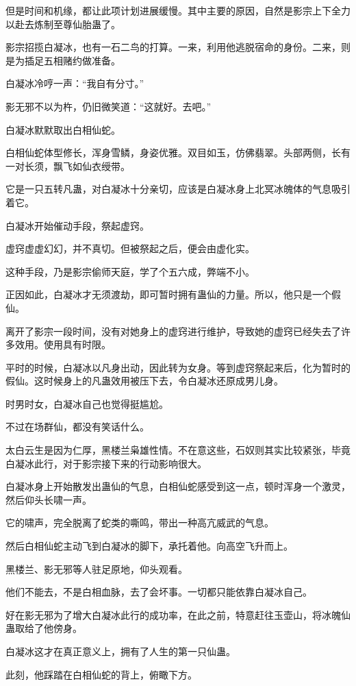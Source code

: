 \begin{this_body}
但是时间和机缘，都让此项计划进展缓慢。其中主要的原因，自然是影宗上下全力以赴去炼制至尊仙胎蛊了。

影宗招揽白凝冰，也有一石二鸟的打算。一来，利用他逃脱宿命的身份。二来，则是为插足五相赌约做准备。

白凝冰冷哼一声：“我自有分寸。”

影无邪不以为杵，仍旧微笑道：“这就好。去吧。”

白凝冰默默取出白相仙蛇。

白相仙蛇体型修长，浑身雪鳞，身姿优雅。双目如玉，仿佛翡翠。头部两侧，长有一对长须，飘飞如仙衣绶带。

它是一只五转凡蛊，对白凝冰十分亲切，应该是白凝冰身上北冥冰魄体的气息吸引着它。

白凝冰开始催动手段，祭起虚窍。

虚窍虚虚幻幻，并不真切。但被祭起之后，便会由虚化实。

这种手段，乃是影宗偷师天庭，学了个五六成，弊端不小。

正因如此，白凝冰才无须渡劫，即可暂时拥有蛊仙的力量。所以，他只是一个假仙。

离开了影宗一段时间，没有对她身上的虚窍进行维护，导致她的虚窍已经失去了许多效用。使用具有时限。

平时的时候，白凝冰以凡身出动，因此转为女身。等到虚窍祭起来后，化为暂时的假仙。这时候身上的凡蛊效用被压下去，令白凝冰还原成男儿身。

时男时女，白凝冰自己也觉得挺尴尬。

不过在场群仙，都没有笑话什么。

太白云生是因为仁厚，黑楼兰枭雄性情。不在意这些，石奴则其实比较紧张，毕竟白凝冰此行，对于影宗接下来的行动影响很大。

白凝冰身上开始散发出蛊仙的气息，白相仙蛇感受到这一点，顿时浑身一个激灵，然后仰头长啸一声。

它的啸声，完全脱离了蛇类的嘶鸣，带出一种高亢威武的气息。

然后白相仙蛇主动飞到白凝冰的脚下，承托着他。向高空飞升而上。

黑楼兰、影无邪等人驻足原地，仰头观看。

他们不能去，不是白相血脉，去了会坏事。一切都只能依靠白凝冰自己。

好在影无邪为了增大白凝冰此行的成功率，在此之前，特意赶往玉壶山，将冰魄仙蛊取给了他傍身。

白凝冰这才在真正意义上，拥有了人生的第一只仙蛊。

此刻，他踩踏在白相仙蛇的背上，俯瞰下方。


\end{this_body}
